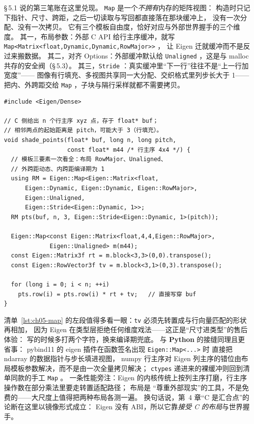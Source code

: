 \documentclass[12pt,a4paper,fontset=fandol]{ctexbook}
\newcommand{\Tp}[1]{\texttt{#1}}
\newcommand{\Bk}{\allowbreak}
\newcommand{\Lang}[1]{\textsf{\bfseries #1}}
\newcommand{\PY}{\Lang{Python}}
\begin{document}
\S\,5.1 说的第三笔账在这里兑现。
\Tp{Map} \Bk{} 是一个\emph{不拥有}内存的矩阵视图：
构造时只记下指针、尺寸、跨距，之后一切读取与写回都直接落在那块缓冲上，
没有一次分配、没有一次拷贝。
它有三个模板自由度，恰好对应与外部世界握手的三个维度。
其一，布局参数：外部 C API 给行主序缓冲，就写
\Tp{Map<Matrix<float,Dynamic,Dynamic,RowMajor>>} \Bk{}，
让 Eigen 迁就缓冲而不是反过来搬数据。
其二，对齐 Options：外部缓冲默认给 \Tp{Unaligned} \Bk{}，这是与 malloc 共存的安全阀（\S\,5.3）。
其三，\Tp{Stride} \Bk{}：真实缓冲里``下一行''往往不是``上一行加宽度''——
图像有行填充、多视图共享同一大分配、交织格式里列步长大于 1——
把内、外跨距交给 \Tp{Map} \Bk{}，子块与隔行采样就都不需要拷贝。

\begin{lstlisting}[style=cppstyle,caption={用 \Tp{Map} 接住 C 侧行主序缓冲、按跨距解释、原地写回},label={lst:ch05-map}]
#include <Eigen/Dense>

// C 侧给出 n 个行主序 xyz 点，存于 float* buf；
// 相邻两点的起始距离是 pitch，可能大于 3（行填充）。
void shade_points(float* buf, long n, long pitch,
                  const float* m44 /* 行主序 4x4 */) {
  // 模板三要素一次看全：布局 RowMajor、Unaligned、
  // 外跨距动态、内跨距编译期为 1
  using RM = Eigen::Map<Eigen::Matrix<float,
      Eigen::Dynamic, Eigen::Dynamic, Eigen::RowMajor>,
      Eigen::Unaligned,
      Eigen::Stride<Eigen::Dynamic, 1>>;
  RM pts(buf, n, 3, Eigen::Stride<Eigen::Dynamic, 1>(pitch));

  Eigen::Map<const Eigen::Matrix<float,4,4,Eigen::RowMajor>,
             Eigen::Unaligned> m(m44);
  const Eigen::Matrix3f rt = m.block<3,3>(0,0).transpose();
  const Eigen::RowVector3f tv = m.block<3,1>(0,3).transpose();

  for (long i = 0; i < n; ++i)
    pts.row(i) = pts.row(i) * rt + tv;   // 直接写穿 buf
}
\end{lstlisting}

清单~\ref{lst:ch05-map} 的左段值得多看一眼：\Tp{tv} \Bk{} 必须先转置成与行向量匹配的形状再相加，
因为 Eigen 在类型层拒绝任何维度戏法——这正是``尺寸进类型''的售后体验：
写的时候多打两个字符，换来编译期兜底。
与 \PY{} 的接缝同理且更省事：
pybind11 的 eigen 插件在函数签名出现 \Tp{Eigen::Map<...>} \Bk{} 时
直接把 ndarray 的数据指针与步长填进视图，
numpy 行主序对 Eigen 列主序的错位由布局模板参数解决，而不是由一次全量拷贝解决；
\Tp{ctypes} \Bk{} 递进来的裸缓冲则回到清单同款的手工 \Tp{Map} \Bk{}。
一条性能旁注：Eigen 的内核传统上按列主序打磨，行主序操作数在部分乘法里要走转置适配路径；
布局是 ``尊重外部现实''的工具，不是免费的——大尺度上值得把两种布局各测一遍。
换句话说，第~4 章``C 是汇合点''的论断在这里以镜像形式成立：
Eigen 没有 ABI，所以它靠\emph{接受 C 的布局}与世界握手。
\end{document}
